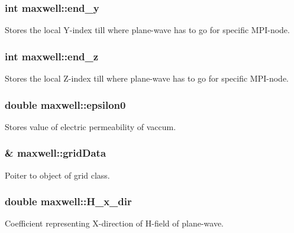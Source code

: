 \subsubsection[{\texorpdfstring{end\+\_\+y}{end_y}}]{\setlength{\rightskip}{0pt plus 5cm}int maxwell\+::end\+\_\+y}\hypertarget{classmaxwell_a43edb6394c7e1e7c2791cd33f15a704f}{}\label{classmaxwell_a43edb6394c7e1e7c2791cd33f15a704f}
Stores the local Y-\/index till where plane-\/wave has to go for specific M\+P\+I-\/node. 
\subsubsection[{\texorpdfstring{end\+\_\+z}{end_z}}]{\setlength{\rightskip}{0pt plus 5cm}int maxwell\+::end\+\_\+z}\hypertarget{classmaxwell_a6669d673ec8bff76299f6a879558aab7}{}\label{classmaxwell_a6669d673ec8bff76299f6a879558aab7}
Stores the local Z-\/index till where plane-\/wave has to go for specific M\+P\+I-\/node. 
\subsubsection[{\texorpdfstring{epsilon0}{epsilon0}}]{\setlength{\rightskip}{0pt plus 5cm}double maxwell\+::epsilon0}\hypertarget{classmaxwell_a788555c5fe0593392febb872915e7e0a}{}\label{classmaxwell_a788555c5fe0593392febb872915e7e0a}
Stores value of electric permeability of vaccum. 
\subsubsection[{\texorpdfstring{grid\+Data}{gridData}}]{\& maxwell\+::grid\+Data}\hypertarget{classmaxwell_a9c6323aba3021f162ada73b5e06366f9}{}\label{classmaxwell_a9c6323aba3021f162ada73b5e06366f9}
Poiter to object of grid class. 
\subsubsection[{\texorpdfstring{H\+\_\+x\+\_\+dir}{H_x_dir}}]{\setlength{\rightskip}{0pt plus 5cm}double maxwell\+::\+H\+\_\+x\+\_\+dir}\hypertarget{classmaxwell_abfa28d79b45ce7c3b9a45c97903057a2}{}\label{classmaxwell_abfa28d79b45ce7c3b9a45c97903057a2}
Coefficient representing X-\/direction of H-\/field of plane-\/wave. 
